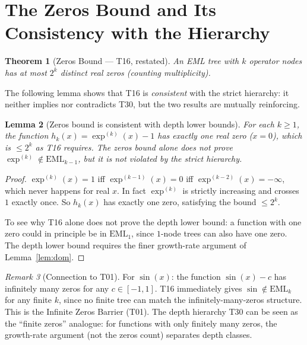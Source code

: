 \documentclass[12pt,a4paper]{article}
\newtheorem{theorem}{Theorem}[section]
\newtheorem{lemma}[theorem]{Lemma}
\theoremstyle{definition}
\theoremstyle{remark}
\newtheorem{remark}[theorem]{Remark}
\begin{document}
\section{The Zeros Bound and Its Consistency with the Hierarchy}

\begin{theorem}[Zeros Bound — T16, restated]\label{thm:zeros}
An EML tree with $k$ operator nodes has at most $2^k$ distinct real zeros
(counting multiplicity).
\end{theorem}

The following lemma shows that T16 is \emph{consistent} with the strict
hierarchy: it neither implies nor contradicts T30, but the two results are
mutually reinforcing.

\begin{lemma}[Zeros bound is consistent with depth lower bounds]\label{lem:zeros-consistent}
For each $k\geq 1$, the function $h_k(x)=\exp^{(k)}(x)-1$ has exactly one
real zero ($x=0$), which is $\leq 2^k$ as T16 requires.  The zeros bound
alone does not prove $\exp^{(k)}\notin\mathrm{EML}_{k-1}$, but it is not
violated by the strict hierarchy.
\end{lemma}

\begin{proof}
$\exp^{(k)}(x)=1$ iff $\exp^{(k-1)}(x)=0$ iff $\exp^{(k-2)}(x)=-\infty$,
which never happens for real $x$.  In fact $\exp^{(k)}$ is strictly increasing
and crosses~$1$ exactly once.  So $h_k(x)$ has exactly one zero, satisfying the
bound $\leq 2^k$.

To see why T16 alone does not prove the depth lower bound: a function with
one zero could in principle be in $\mathrm{EML}_1$, since $1$-node trees can
also have one zero.  The depth lower bound requires the finer growth-rate
argument of Lemma~\ref{lem:dom}.
\end{proof}

\begin{remark}[Connection to T01]
For $\sin(x)$: the function $\sin(x)-c$ has infinitely many zeros for any
$c\in[-1,1]$.  T16 immediately gives $\sin\notin\mathrm{EML}_k$ for any finite
$k$, since no finite tree can match the infinitely-many-zeros structure.
This is the Infinite Zeros Barrier (T01).  The depth hierarchy T30 can be
seen as the ``finite zeros'' analogue: for functions with only finitely many
zeros, the growth-rate argument (not the zeros count) separates depth classes.
\end{remark}
\end{document}
